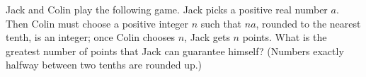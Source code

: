 Jack and Colin play the following game. Jack picks a positive real number $a$. Then Colin must choose a positive integer $n$ such that $na$, rounded to the nearest tenth, is an integer; once Colin chooses $n$, Jack gets $n$ points. What is the greatest number of points that Jack can guarantee himself? (Numbers exactly halfway between two tenths are rounded up.)
